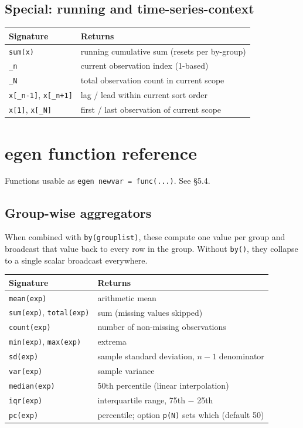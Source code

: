 \documentclass[11pt,letterpaper]{article}
\begin{document}
\subsection{Special: running and time-series-context}

\begin{center}
\begin{tabular}{ll}
\toprule
Signature & Returns \\
\midrule
\texttt{sum(x)} & running cumulative sum (resets per by-group) \\
\texttt{\_n} & current observation index (1-based) \\
\texttt{\_N} & total observation count in current scope \\
\texttt{x[\_n-1]}, \texttt{x[\_n+1]} & lag / lead within current sort order \\
\texttt{x[1]}, \texttt{x[\_N]} & first / last observation of current scope \\
\bottomrule
\end{tabular}
\end{center}

\section{egen function reference}

Functions usable as \verb|egen newvar = func(...)|.  See \S5.4.

\subsection{Group-wise aggregators}

When combined with \texttt{by(grouplist)}, these compute one value per
group and broadcast that value back to every row in the group.  Without
\texttt{by()}, they collapse to a single scalar broadcast everywhere.

\begin{center}
\begin{tabular}{ll}
\toprule
Signature & Returns \\
\midrule
\texttt{mean(exp)} & arithmetic mean \\
\texttt{sum(exp)}, \texttt{total(exp)} & sum (missing values skipped) \\
\texttt{count(exp)} & number of non-missing observations \\
\texttt{min(exp)}, \texttt{max(exp)} & extrema \\
\texttt{sd(exp)} & sample standard deviation, $n-1$ denominator \\
\texttt{var(exp)} & sample variance \\
\texttt{median(exp)} & 50th percentile (linear interpolation) \\
\texttt{iqr(exp)} & interquartile range, 75th $-$ 25th \\
\texttt{pc(exp)} & percentile; option \texttt{p(N)} sets which (default 50) \\
\bottomrule
\end{tabular}
\end{center}
\end{document}
